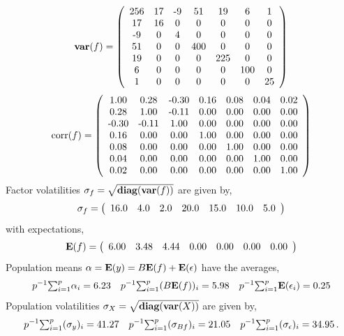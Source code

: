 \begin{align} 
 \var(f) = \left( \begin{array}{ccccccc} 
$256$ & $17$ & $-9$ & $51$ & $19$ & $6$ & $1$ \\ 
$17$ & $16$ & $0$ & $0$ & $0$ & $0$ & $0$ \\ 
$-9$ & $0$ & $4$ & $0$ & $0$ & $0$ & $0$ \\ 
$51$ & $0$ & $0$ & $400$ & $0$ & $0$ & $0$ \\ 
$19$ & $0$ & $0$ & $0$ & $225$ & $0$ & $0$ \\ 
$6$ & $0$ & $0$ & $0$ & $0$ & $100$ & $0$ \\ 
$1$ & $0$ & $0$ & $0$ & $0$ & $0$ & $25$ \\ 
\end{array} \right) 
 \end{align} 
\begin{align} 
 \text{corr}(f) = \left( \begin{array}{ccccccc} 
$1.00$ & $0.28$ & $-0.30$ & $0.16$ & $0.08$ & $0.04$ & $0.02$ \\ 
$0.28$ & $1.00$ & $-0.11$ & $0.00$ & $0.00$ & $0.00$ & $0.00$ \\ 
$-0.30$ & $-0.11$ & $1.00$ & $0.00$ & $0.00$ & $0.00$ & $0.00$ \\ 
$0.16$ & $0.00$ & $0.00$ & $1.00$ & $0.00$ & $0.00$ & $0.00$ \\ 
$0.08$ & $0.00$ & $0.00$ & $0.00$ & $1.00$ & $0.00$ & $0.00$ \\ 
$0.04$ & $0.00$ & $0.00$ & $0.00$ & $0.00$ & $1.00$ & $0.00$ \\ 
$0.02$ & $0.00$ & $0.00$ & $0.00$ & $0.00$ & $0.00$ & $1.00$ \\ 
\end{array} \right) 
 \end{align}Factor volatilities $\sigma_f = \sqrt{\textbf{diag}(\textbf{var}(f))}$ are given by, 
 \begin{align} 
 \sigma_f = \left( \begin{array}{ccccccc} 
$16.0$ & $4.0$ & $2.0$ & $20.0$ & $15.0$ & $10.0$ & $5.0$ \\ 
\end{array} \right) 
 \end{align}with expectations, \begin{align} 
 \Exp(f) = \left( \begin{array}{ccccccc} 
$6.00$ & $3.48$ & $4.44$ & $0.00$ & $0.00$ & $0.00$ & $0.00$ \\ 
\end{array} \right) 
 \end{align}Population means $\alpha = \textbf{E}(y) = B \textbf{E}(f) + \textbf{E}(\epsilon)$ have the averages,\begin{align*} 
p^{-1} {\textstyle\sum\nolimits}_{i=1}^p \alpha_i = 6.23\quad  p^{-1} {\textstyle\sum\nolimits}_{i=1}^p (B\textbf{E}(f))_i = 5.98\quad p^{-1} {\textstyle\sum\nolimits}_{i=1}^p \textbf{E}(\epsilon_i) = 0.25
 \end{align*}Population volatilities $\sigma_X =\sqrt{\textbf{diag}(\textbf{var}(X))}$ are given by, 
 \begin{align*} 
p^{-1} {\textstyle\sum\nolimits}_{i=1}^p (\sigma_y)_i = 41.27\quad  p^{-1} {\textstyle\sum\nolimits}_{i=1}^p (\sigma_{Bf})_i = 21.05\quad p^{-1} {\textstyle\sum\nolimits}_{i=1}^p (\sigma_{\epsilon})_i = 34.95 \, .
 \end{align*}
